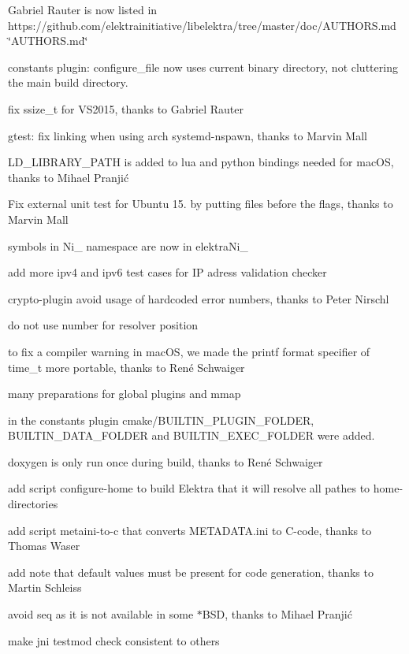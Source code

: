 \begin{DoxyItemize}
\item Gabriel Rauter is now listed in https\+://github.com/elektrainitiative/libelektra/tree/master/doc/\+A\+U\+T\+H\+O\+R\+S.\+md \char`\"{}\+A\+U\+T\+H\+O\+R\+S.\+md\char`\"{}
\item constants plugin\+: configure\+\_\+file now uses current binary directory, not cluttering the main build directory.
\item fix ssize\+\_\+t for V\+S2015, thanks to Gabriel Rauter
\item gtest\+: fix linking when using arch systemd-\/nspawn, thanks to Marvin Mall
\item {\ttfamily L\+D\+\_\+\+L\+I\+B\+R\+A\+R\+Y\+\_\+\+P\+A\+TH} is added to lua and python bindings needed for mac\+OS, thanks to Mihael Pranjić
\item Fix external unit test for Ubuntu 15. by putting files before the flags, thanks to Marvin Mall
\item symbols in Ni\+\_\+ namespace are now in elektra\+Ni\+\_\+
\item add more ipv4 and ipv6 test cases for IP adress validation checker
\item crypto-\/plugin avoid usage of hardcoded error numbers, thanks to Peter Nirschl
\item do not use number for resolver position
\item to fix a compiler warning in mac\+OS, we made the printf format specifier of time\+\_\+t more portable, thanks to René Schwaiger
\item many preparations for global plugins and mmap
\item in the constants plugin {\ttfamily cmake/\+B\+U\+I\+L\+T\+I\+N\+\_\+\+P\+L\+U\+G\+I\+N\+\_\+\+F\+O\+L\+D\+ER}, {\ttfamily B\+U\+I\+L\+T\+I\+N\+\_\+\+D\+A\+T\+A\+\_\+\+F\+O\+L\+D\+ER} and {\ttfamily B\+U\+I\+L\+T\+I\+N\+\_\+\+E\+X\+E\+C\+\_\+\+F\+O\+L\+D\+ER} were added.
\item doxygen is only run once during build, thanks to René Schwaiger
\item add script configure-\/home to build Elektra that it will resolve all pathes to home-\/directories
\item add script metaini-\/to-\/c that converts M\+E\+T\+A\+D\+A\+T\+A.\+ini to C-\/code, thanks to Thomas Waser
\item add note that default values must be present for code generation, thanks to Martin Schleiss
\item avoid {\ttfamily seq} as it is not available in some {\ttfamily $\ast$\+B\+SD}, thanks to Mihael Pranjić
\item make jni testmod check consistent to others
\end{DoxyItemize}

